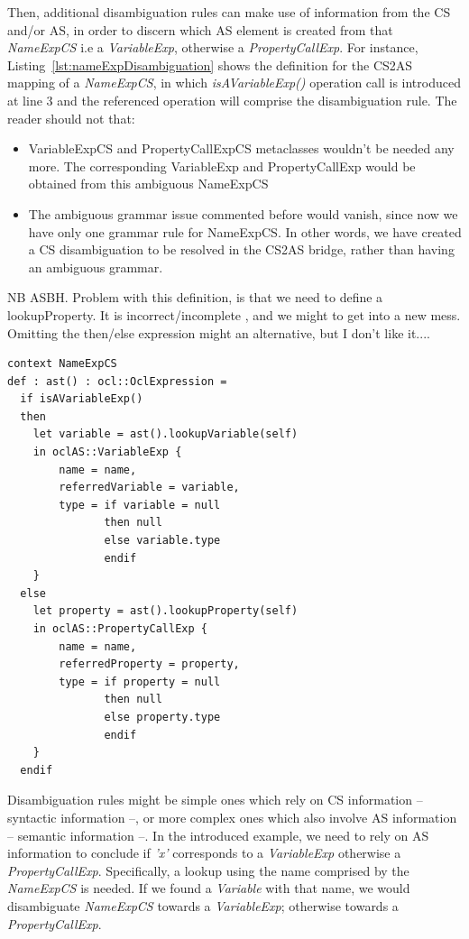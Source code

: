 \documentclass{llncs}
\begin{document}
Then, additional disambiguation rules can make use of information from the CS and/or AS, in order to discern which AS element is created from that \emph{NameExpCS} i.e a \emph{VariableExp}, otherwise a \emph{PropertyCallExp}. For instance, Listing~\ref{lst:nameExpDisambiguation} shows the definition for the CS2AS mapping of a \emph{NameExpCS}, in which \emph{isAVariableExp()} operation call is introduced at line 3 and the referenced operation will comprise the disambiguation rule. The reader should not that:

\begin{itemize}
\item VariableExpCS and PropertyCallExpCS metaclasses wouldn't be needed any more. The corresponding VariableExp and PropertyCallExp would be obtained from this ambiguous NameExpCS
\item The ambiguous grammar issue commented before would vanish, since now we have only one grammar rule for NameExpCS. In other words, we have created a CS disambiguation to be resolved in the CS2AS bridge, rather than having an ambiguous grammar.
\end{itemize}

NB ASBH. Problem with this definition, is that we need to define a lookupProperty. It is incorrect/incomplete , and we might to get into a new mess. Omitting the then/else expression might an alternative, but I don't like it....
\begin{lstlisting}[caption=CS2AS description for an ambiguous name expression, label=lst:nameExpDisambiguation, language=OCL]
context NameExpCS
def : ast() : ocl::OclExpression =
  if isAVariableExp() 
  then
    let variable = ast().lookupVariable(self)
    in oclAS::VariableExp {
        name = name,
        referredVariable = variable,
        type = if variable = null
               then null
               else variable.type
               endif
    }
  else 
    let property = ast().lookupProperty(self)
    in oclAS::PropertyCallExp {
        name = name,
        referredProperty = property,
        type = if property = null
               then null
               else property.type
               endif
    }
  endif	
\end{lstlisting}

Disambiguation rules might be simple ones which rely on CS information -- syntactic information --, or more complex ones which also involve AS information -- semantic information --. In the introduced example, we need to rely on AS information to conclude if \emph{'x'} corresponds to a \emph{VariableExp} otherwise a \emph{PropertyCallExp}. Specifically, a lookup using the name comprised by the \emph{NameExpCS} is needed. If we found a \emph{Variable} with that name, we would disambiguate \emph{NameExpCS} towards a \emph{VariableExp}; otherwise towards a \emph{PropertyCallExp}. 
\end{document}
